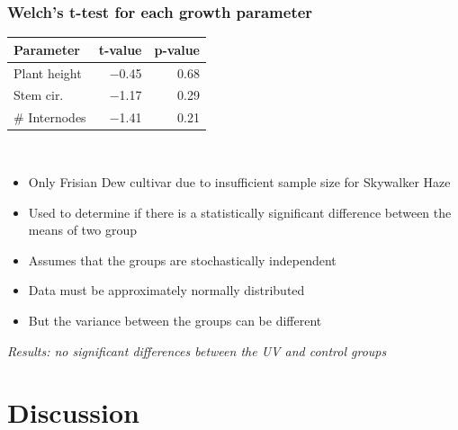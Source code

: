 \documentclass[
    12pt,
    aspectratio=1610,
    b,
    bibliography=../bibliography.bib,
    link-citations]{beamer}
\begin{document}
    \begin{frame}
        \frametitle{Welch's t-test for each growth parameter}
        \footnotesize
        \begin{tabular}{lrr}
            Parameter & t-value & p-value \\
            \midrule
            Plant height & \num[mode=text]{-0.45} & \num[mode=text]{0.68} \\
            Stem cir. & \num[mode=text]{-1.17} & \num[mode=text]{0.29} \\
            \# Internodes & \num[mode=text]{-1.41} & \num[mode=text]{0.21} \\
        \end{tabular} \\
        \vfill
        \begin{itemize}
            \item Only Frisian Dew cultivar due to insufficient sample size for Skywalker Haze
            \item Used to determine if there is a statistically significant difference between the means of two group
            \item Assumes that the groups are stochastically independent
            \item Data must be approximately normally distributed
            \item But the variance between the groups can be different
        \end{itemize}
        \vfill
        \em{Results: no significant differences between the UV and control groups}
    \end{frame}

    \section{Discussion}
\end{document}
